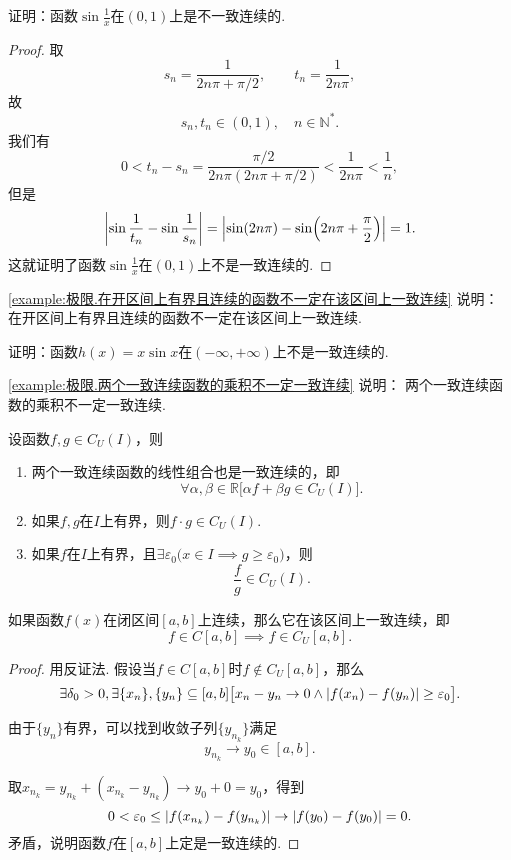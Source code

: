 \begin{example}\label{example:极限.在开区间上有界且连续的函数不一定在该区间上一致连续}
证明：函数\(\sin\frac{1}{x}\)在\((0,1)\)上是不一致连续的.
\begin{proof}
取\[
s_n = \frac{1}{2n\pi+\pi/2},
\qquad
t_n = \frac{1}{2n\pi},
\]故\[
s_n,t_n\in(0,1),
\quad n\in\mathbb{N}^*.
\]我们有\[
0 < t_n - s_n = \frac{\pi/2}{2n\pi(2n\pi+\pi/2)} < \frac{1}{2n\pi} < \frac{1}{n},
\]但是\[
\abs{\sin\frac{1}{t_n} - \sin\frac{1}{s_n}}
= \abs{\sin(2n\pi) - \sin(2n\pi+\frac{\pi}{2})}
= 1.
\]这就证明了函数\(\sin\frac{1}{x}\)在\((0,1)\)上不是一致连续的.
\end{proof}
\end{example}
\cref{example:极限.在开区间上有界且连续的函数不一定在该区间上一致连续} 说明：
在开区间上有界且连续的函数不一定在该区间上一致连续.

\begin{example}\label{example:极限.两个一致连续函数的乘积不一定一致连续}
证明：函数\(h(x) = x \sin x\)在\((-\infty,+\infty)\)上不是一致连续的.
\end{example}
\cref{example:极限.两个一致连续函数的乘积不一定一致连续} 说明：
两个一致连续函数的乘积不一定一致连续.

\begin{theorem}[一致连续函数的四则运算法则]\label{theorem:极限.闭区间上连续函数的性质.一致连续函数的四则运算法则}
设函数\(f,g \in C_U(I)\)，则
\begin{enumerate}
\item 两个一致连续函数的线性组合也是一致连续的，即\[
\forall\alpha,\beta\in\mathbb{R} \bigl[ \alpha f + \beta g \in C_U(I) \bigr].
\]

\item 如果\(f,g\)在\(I\)上有界，则\(f \cdot g \in C_U(I)\).

\item 如果\(f\)在\(I\)上有界，且\(\exists\varepsilon_0 \bigl( x \in I \implies g \geq \varepsilon_0 \bigr)\)，则\[
\frac{f}{g} \in C_U(I).
\]
\end{enumerate}
\end{theorem}

\begin{theorem}[一致连续性定理]\label{theorem:极限.闭区间上连续函数的性质.一致连续性定理}
如果函数\(f(x)\)在闭区间\([a,b]\)上连续，那么它在该区间上一致连续，即\[
f \in C[a,b]
\implies
f \in C_U[a,b].
\]
\begin{proof}
用反证法.
假设当\(f \in C[a,b]\)时\(f \notin C_U[a,b]\)，那么\[
\exists\delta_0>0,
\exists\{x_n\},\{y_n\}\subseteq[a,b]
\bigl[
x_n-y_n\to0
\land
\abs{f(x_n)-f(y_n)}\geq\varepsilon_0
\bigr].
\]

由于\(\{y_n\}\)有界，可以找到收敛子列\(\{y_{n_k}\}\)满足\[
y_{n_k} \to y_0\in[a,b].
\]

取\(x_{n_k} = y_{n_k} + (x_{n_k} - y_{n_k})
\to y_0 + 0 = y_0\)，得到\[
0 < \varepsilon_0 \leq \abs{f(x_{n_k})-f(y_{n_k})}
\to \abs{f(y_0)-f(y_0)} = 0.
\]矛盾，说明函数\(f\)在\([a,b]\)上定是一致连续的.
\end{proof}
\end{theorem}


